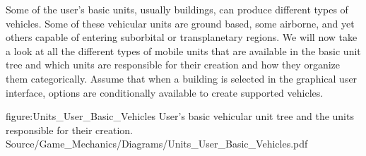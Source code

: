     {}

Some of the user's basic units, usually buildings, can produce different types of vehicles. Some of these vehicular units are ground based, some airborne, and yet others capable of entering suborbital or transplanetary regions. We will now take a look at all the different types of mobile units that are available in the basic unit tree and which units are responsible for their creation and how they organize them categorically. Assume that when a building is selected in the graphical user interface, options are conditionally available to create supported vehicles.

\FullPageDiagram
    {figure:Units_User_Basic_Vehicles}
    {User's basic vehicular unit tree and the units responsible for their creation.}
    {Source/Game_Mechanics/Diagrams/Units_User_Basic_Vehicles.pdf}

